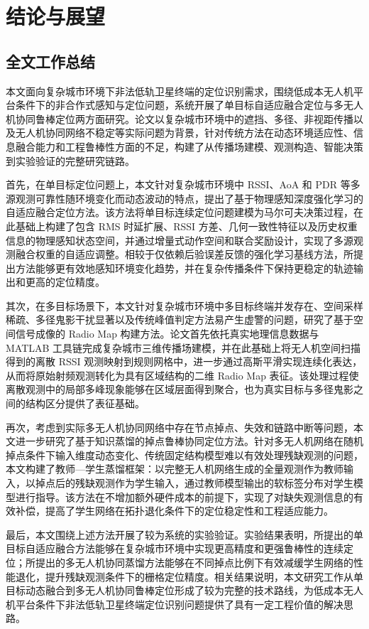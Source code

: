 \chapter{结论与展望}
\label{ch:conclusion}

\section{全文工作总结}
\label{sec:5_1}

本文面向复杂城市环境下非法低轨卫星终端的定位识别需求，围绕低成本无人机平台条件下的非合作式感知与定位问题，系统开展了单目标自适应融合定位与多无人机协同鲁棒定位两方面研究。论文以复杂城市环境中的遮挡、多径、非视距传播以及无人机协同网络不稳定等实际问题为背景，针对传统方法在动态环境适应性、信息融合能力和工程鲁棒性方面的不足，构建了从传播场建模、观测构造、智能决策到实验验证的完整研究链路。

首先，在单目标定位问题上，本文针对复杂城市环境中 RSSI、AoA 和 PDR 等多源观测可靠性随环境变化而动态波动的特点，提出了基于物理感知深度强化学习的自适应融合定位方法。该方法将单目标连续定位问题建模为马尔可夫决策过程，在此基础上构建了包含 RMS 时延扩展、RSSI 方差、几何一致性特征以及历史权重信息的物理感知状态空间，并通过增量式动作空间和联合奖励设计，实现了多源观测融合权重的自适应调整。相较于仅依赖后验误差反馈的强化学习基线方法，所提出方法能够更有效地感知环境变化趋势，并在复杂传播条件下保持更稳定的轨迹输出和更高的定位精度。

其次，在多目标场景下，本文针对复杂城市环境中多目标终端并发存在、空间采样稀疏、多径鬼影干扰显著以及传统峰值判定方法易产生虚警的问题，研究了基于空间信号成像的 Radio Map 构建方法。论文首先依托真实地理信息数据与 MATLAB 工具链完成复杂城市三维传播场建模，并在此基础上将无人机空间扫描得到的离散 RSSI 观测映射到规则网格中，进一步通过高斯平滑实现连续化表达，从而将原始射频观测转化为具有区域结构的二维 Radio Map 表征。该处理过程使离散观测中的局部多峰现象能够在区域层面得到聚合，也为真实目标与多径鬼影之间的结构区分提供了表征基础。

再次，考虑到实际多无人机协同网络中存在节点掉点、失效和链路中断等问题，本文进一步研究了基于知识蒸馏的掉点鲁棒协同定位方法。针对多无人机网络在随机掉点条件下输入维度动态变化、传统固定结构模型难以有效处理残缺观测的问题，本文构建了教师—学生蒸馏框架：以完整无人机网络生成的全量观测作为教师输入，以掉点后的残缺观测作为学生输入，通过教师模型输出的软标签分布对学生模型进行指导。该方法在不增加额外硬件成本的前提下，实现了对缺失观测信息的有效补偿，提高了学生网络在拓扑退化条件下的定位稳定性和工程适应能力。

最后，本文围绕上述方法开展了较为系统的实验验证。实验结果表明，所提出的单目标自适应融合方法能够在复杂城市环境中实现更高精度和更强鲁棒性的连续定位；所提出的多无人机协同蒸馏方法能够在不同掉点比例下有效减缓学生网络的性能退化，提升残缺观测条件下的栅格定位精度。相关结果说明，本文研究工作从单目标动态融合到多无人机协同鲁棒定位形成了较为完整的技术路线，为低成本无人机平台条件下非法低轨卫星终端定位识别问题提供了具有一定工程价值的解决思路。

